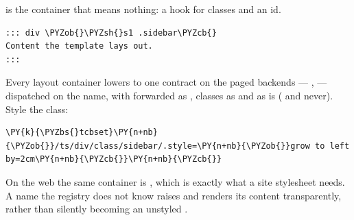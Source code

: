 \documentclass[a4paper,twoside]{article}
\begin{document}
 is the container that means nothing: a hook for classes and an id.
\begin{tscode}[lang=md, engine=pygments]
\begin{Verbatim}[commandchars=\\\{\},breaklines, breakanywhere, commandchars=\\\{\}]
::: div \PYZob{}\PYZsh{}s1 .sidebar\PYZcb{}
Content the template lays out.
:::
\end{Verbatim}
\end{tscode}
Every layout container lowers to one contract on the paged backends ---
,  --- dispatched on the name,
with  forwarded as , classes as  and  as is
( and  never). Style the class:
\begin{tscode}[lang=latex, engine=pygments]
\begin{Verbatim}[commandchars=\\\{\},breaklines, breakanywhere, commandchars=\\\{\}]
\PY{k}{\PYZbs{}tcbset}\PY{n+nb}{\PYZob{}}/ts/div/class/sidebar/.style=\PY{n+nb}{\PYZob{}}grow to left by=2cm\PY{n+nb}{\PYZcb{}}\PY{n+nb}{\PYZcb{}}
\end{Verbatim}
\end{tscode}
On the web the same container is , which is exactly what
a site stylesheet needs. A name the registry does not know raises
 and renders its content transparently, rather than silently
becoming an unstyled .
\end{document}
